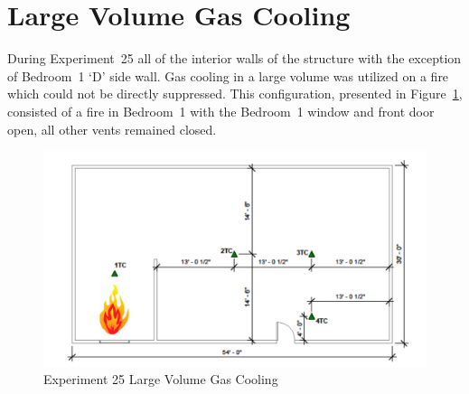 \documentclass[12pt,oneside]{book}
\begin{document}
\clearpage

\section{Large Volume Gas Cooling}
During Experiment~25 all of the interior walls of the structure with the exception of Bedroom~1 `D' side wall. Gas cooling in a large volume was utilized on a fire which could not be directly suppressed. This configuration, presented in Figure~\ref{fig:Gas_Cooling}, consisted of a fire in Bedroom~1 with the Bedroom~1 window and front door open, all other vents remained closed.  

\begin{figure}[H]
\centering
\includegraphics[width=5in]{../0_Images/Ventilation_Configurations/gas_cooling_new_flame.pdf}
\caption{Experiment 25 Large Volume Gas Cooling}
\label{fig:Gas_Cooling}
\end{figure}
\end{document}

